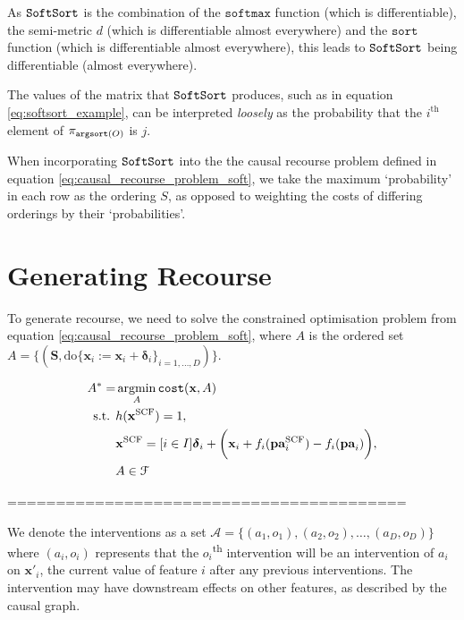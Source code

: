 As $\operatorname*{\texttt{SoftSort}}$ is the combination of the $\texttt{softmax}$ function (which is differentiable), the semi-metric $d$ (which is differentiable almost everywhere) and the $\texttt{sort}$ function (which is differentiable almost everywhere), this leads to $\operatorname*{\texttt{SoftSort}}$ being differentiable (almost everywhere).

The values of the matrix that $\operatorname*{\texttt{SoftSort}}$ produces, such as in equation \ref{eq:softsort_example}, can be interpreted \textit{loosely} as the probability that the $i^{\text{th}}$ element of $\pi_{\operatorname*{\texttt{argsort}}(O)}$ is $j$.

When incorporating $\operatorname*{\texttt{SoftSort}}$ into the the causal recourse problem defined in equation \ref{eq:causal_recourse_problem_soft}, we take the maximum `probability' in each row as the ordering $S$, as opposed to weighting the costs of differing orderings by their `probabilities'.

\section{Generating Recourse}

To generate recourse, we need to solve the constrained optimisation problem from equation \ref{eq:causal_recourse_problem_soft}, where $A$ is the ordered set $A = \big\{(\mathbf{S}, \text{do} \{\mathbf{x}_i:=\mathbf{x}_i + \boldsymbol{\delta}_i\}_{i=1, \ldots, D})\big\}$.

\begin{align}
	A^* = & \operatorname*{argmin}_{A} \texttt{cost}(\mathbf{x}, A) \\ \nonumber
	\text{s.t. } & h(\mathbf{x}^{\text{SCF}}) = 1, \\ \nonumber
	& 	\mathbf{x}^{\text{SCF}} = [i \in I] \boldsymbol{\delta}_i + \bigg( \mathbf{x}_i + f_i(\textbf{pa}^{\text{SCF}}_i) - f_i(\textbf{pa}_i) \bigg), \\ \nonumber
	& A \in \mathcal{F}
\end{align} 




=========================================


We denote the interventions as a set $\mathcal{A} = \{(a_1, o_1), (a_2, o_2), \ldots, (a_D, o_D)\}$ where $(a_i, o_i)$ represents that the $o_i$\textsuperscript{th} intervention will be an intervention of $a_i$ on $\mathbf{x}'_i$, the current value of feature $i$ after any previous interventions. The intervention may have downstream effects on other features, as described by the causal graph.


